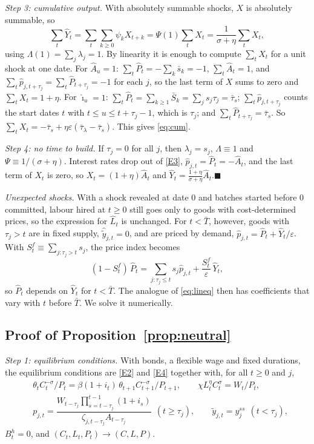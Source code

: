 \documentclass[11pt]{article}
\theoremstyle{definition}
\begin{document}
\emph{Step 3: cumulative output.} With absolutely summable shocks, $X$ is absolutely summable, so
\[
  \sum_t\hat Y_t=\sum_t\sum_{k\ge0}\psi_kX_{t+k}=\Psi(1)\sum_tX_t=\frac{1}{\sigma+\eta}\sum_tX_t ,
\]
using $\Lambda(1)=\sum_j\lambda_j=1$. By linearity it is enough to compute $\sum_tX_t$ for a unit
shock at one date. For $\hat A_u=1$: $\sum_t\hat P_t=-\sum_k\bar s_k=-1$, $\sum_t\hat A_t=1$, and
$\sum_t\hat p_{j,t+\tau_j}=\sum_t\hat P_{t+\tau_j}=-1$ for each $j$, so the last term of $X$ sums to
zero and $\sum_tX_t=1+\eta$. For $\hat\imath_u=1$: $\sum_t\hat P_t=\sum_{k\ge1}\bar S_k=\sum_js_j\tau_j=\bar\tau_s$;
$\sum_t\hat p_{j,t+\tau_j}$ counts the start dates $t$ with $t\le u\le t+\tau_j-1$, which is $\tau_j$;
and $\sum_t\hat P_{t+\tau_j}=\bar\tau_s$. So
$\sum_tX_t=-\bar\tau_s+\eta\varepsilon(\bar\tau_\lambda-\bar\tau_s)$. This gives \eqref{eq:cum}.

\emph{Step 4: no time to build.} If $\tau_j=0$ for all $j$, then $\lambda_j=s_j$, $\Lambda\equiv1$ and
$\Psi\equiv1/(\sigma+\eta)$. Interest rates drop out of \eqref{E3}, $\hat p_{j,t}=\hat P_t=-\hat A_t$,
and the last term of $X_t$ is zero, so $X_t=(1+\eta)\hat A_t$ and
$\hat Y_t=\frac{1+\eta}{\sigma+\eta}\hat A_t$.\hfill$\blacksquare$

\medskip
\noindent\emph{Unexpected shocks.} With a shock revealed at date 0 and batches started before 0
committed, labour hired at $t\ge0$ still goes only to goods with cost-determined prices, so the
expression for $\hat L_t$ is unchanged. For $t<\bar T$, however, goods with $\tau_j>t$ are in fixed
supply, $\hat{\tilde y}_{j,t}=0$, and are priced by demand, $\hat p_{j,t}=\hat P_t+\hat Y_t/\varepsilon$. With
$S^f_t\equiv\sum_{j:\tau_j>t}s_j$, the price index becomes
\[
  (1-S^f_t)\,\hat P_t=\sum_{j:\tau_j\le t}s_j\hat p_{j,t}+\frac{S^f_t}{\varepsilon}\,\hat Y_t ,
\]
so $\hat P_t$ depends on $\hat Y_t$ for $t<\bar T$. The analogue of \eqref{eq:lineq} then has coefficients
that vary with $t$ before $\bar T$. We solve it numerically.

\subsection{Proof of Proposition~\ref{prop:neutral}}\label{app:pf_neutral}

\emph{Step 1: equilibrium conditions.} With bonds, a flexible wage and fixed durations, the
equilibrium conditions are \eqref{E2} and \eqref{E4} together with, for all $t\ge0$ and $j$,
\begin{align}
  &\theta_tC_t^{-\sigma}/P_t=\beta(1+i_t)\,\theta_{t+1}C_{t+1}^{-\sigma}/P_{t+1},
  \qquad\chi L_t^{\eta}C_t^{\sigma}=W_t/P_t, \tag{N1}\label{N1}\\
  &p_{j,t}=\dfrac{W_{t-\tau_j}\prod_{s=t-\tau_j}^{t-1}(1+i_s)}{\zeta_{j,t-\tau_j}A_{t-\tau_j}}\ \ (t\ge\tau_j),
  \qquad\tilde y_{j,t}=y_j^{ss}\ \ (t<\tau_j), \tag{N3}\label{N3}
\end{align}
$B^h_t=0$, and $(C_t,L_t,P_t)\to(C,L,P)$.
\end{document}
